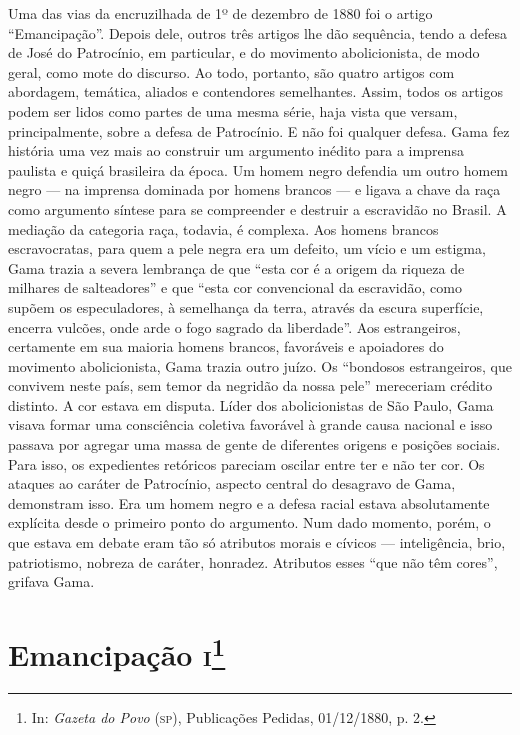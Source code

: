 {\footnotesize\noindent
Uma das vias da encruzilhada de 1º de dezembro de 1880 foi o
artigo ``Emancipação''. Depois dele, outros três artigos lhe dão
sequência, tendo a defesa de José do Patrocínio, em particular, e do
movimento abolicionista, de modo geral, como mote do discurso. Ao todo,
portanto, são quatro artigos com abordagem, temática, aliados e
contendores semelhantes. Assim, todos os artigos podem ser lidos como
partes de uma mesma série, haja vista que versam, principalmente, sobre
a defesa de Patrocínio. E não foi qualquer defesa. Gama fez história uma vez
mais ao construir um argumento inédito para a imprensa paulista e quiçá
brasileira da época. Um homem negro defendia um outro homem negro --- na
imprensa dominada por homens brancos --- e ligava a chave da raça como
argumento síntese para se compreender e destruir a escravidão no Brasil.
A mediação da categoria raça, todavia, é complexa. Aos homens brancos
escravocratas, para quem a pele negra era um defeito, um vício e um
estigma, Gama trazia a severa lembrança de que ``esta cor é a origem da
riqueza de milhares de salteadores'' e que ``esta cor convencional da
escravidão, como supõem os especuladores, à semelhança da terra, através
da escura superfície, encerra vulcões, onde arde o fogo sagrado da
liberdade''. Aos estrangeiros, certamente em sua maioria homens brancos,
favoráveis e apoiadores do movimento abolicionista, Gama trazia outro
juízo. Os ``bondosos estrangeiros, que convivem neste país, sem temor da
negridão da nossa pele'' mereceriam crédito distinto. A cor estava em
disputa. Líder dos abolicionistas de São Paulo, Gama visava formar uma
consciência coletiva favorável à grande causa nacional e isso passava
por agregar uma massa de gente de diferentes origens e posições sociais.
Para isso, os expedientes retóricos pareciam oscilar entre ter e não ter
cor. Os ataques ao caráter de Patrocínio, aspecto central do desagravo
de Gama, demonstram isso. Era um homem negro e a defesa racial estava
absolutamente explícita desde o primeiro ponto do argumento. Num dado
momento, porém, o que estava em debate eram tão só atributos morais e
cívicos --- inteligência, brio, patriotismo, nobreza de caráter,
honradez. Atributos esses ``que não têm cores'', grifava Gama.}
\@openrighttrue\makeatother\endgroup



\chapter{Emancipação \textsc{i}\footnote[*]{In: \emph{Gazeta do Povo}
  (\textsc{sp}), Publicações Pedidas, 01/12/1880, p. 2.}}

